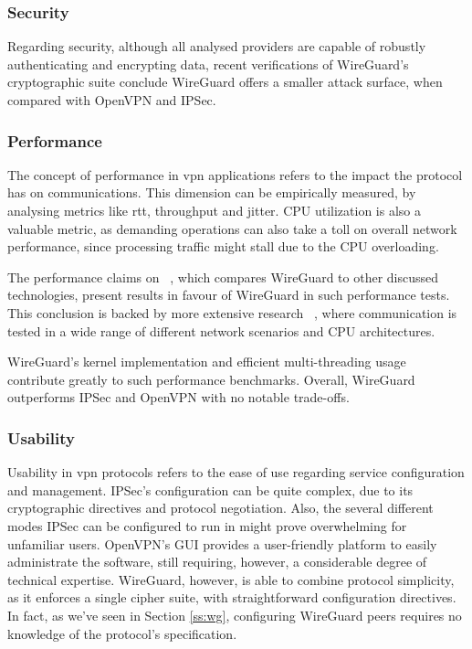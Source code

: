 \documentclass[11pt,twoside,a4paper]{report}
\begin{document}
\subsubsection{Security}

Regarding security, although all analysed providers are capable of robustly authenticating and encrypting data, recent verifications of WireGuard's cryptographic suite \cite{lipp2019mechanised, dowling2018cryptographic} conclude WireGuard offers a smaller attack surface, when compared with OpenVPN and IPSec.

\subsubsection{Performance}

The concept of performance in \ac{vpn} applications refers to the impact the protocol has on communications. This dimension can be empirically measured, by analysing metrics like \ac{rtt}, throughput and jitter. CPU utilization is also a valuable metric, as demanding operations can also take a toll on overall network performance, since processing traffic might stall due to the CPU overloading.

The performance claims on ~\cite{donenfeld2017wireguard}, which compares WireGuard to other discussed technologies, present results in favour of WireGuard in such performance tests. This conclusion is backed by more extensive research ~\cite{mackey2020performance, osswald2020performance}, where communication is tested in a wide range of different network scenarios and CPU architectures.

WireGuard's kernel implementation and efficient multi-threading usage contribute greatly to such performance benchmarks. Overall, WireGuard outperforms IPSec and OpenVPN with no notable trade-offs.

\subsubsection{Usability}

Usability in \ac{vpn} protocols refers to the ease of use regarding service configuration and management. IPSec's configuration can be quite complex, due to its cryptographic directives and protocol negotiation. Also, the several different modes IPSec can be configured to run in might prove overwhelming for unfamiliar users. OpenVPN's GUI provides a user-friendly platform to easily administrate the software, still requiring, however, a considerable degree of technical expertise. WireGuard, however, is able to combine protocol simplicity, as it enforces a single cipher suite, with straightforward configuration directives. In fact, as we've seen in Section \ref{ss:wg}, configuring WireGuard peers requires no knowledge of the protocol's specification.
\end{document}
